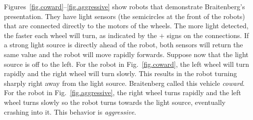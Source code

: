 Figures~\ref{fig.coward}--\ref{fig.aggressive} show robots that demonstrate Braitenberg's presentation. They have light sensors (the semicircles at the front of the robots) that are connected directly to the motors of the wheels. The more light detected, the faster each wheel will turn, as indicated by the $+$ signs on the connections. If a strong light source is directly ahead of the robot, both sensors will return the same value and the robot will move rapidly forwards. Suppose now that the light source is off to the left. For the robot in Fig.~\ref{fig.coward}, the left wheel will turn rapidly and the right wheel will turn slowly. This results in the robot turning sharply right away from the light source. Braitenberg called this vehicle \emph{coward}. For the robot in Fig.~\ref{fig.aggressive}, the right wheel turns rapidly and the left wheel turns slowly so the robot turns towards the light source, eventually crashing into it. This behavior is \emph{aggressive}.


